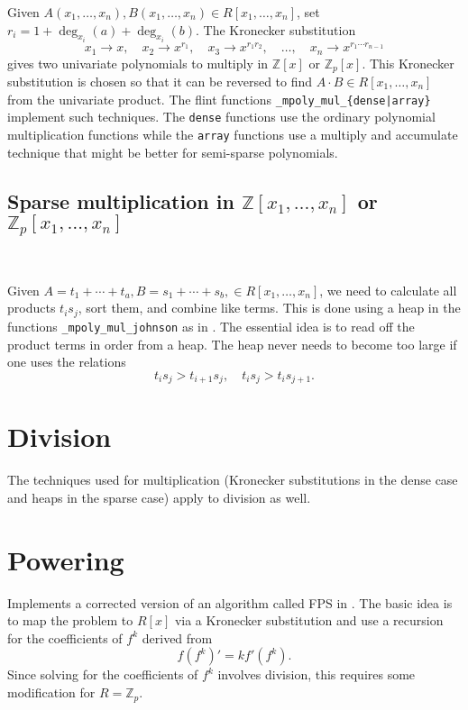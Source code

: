 \documentclass[11pt,reqno]{amsart}
\numberwithin{equation}{section}
\newcommand{\op}[1]  { \operatorname{ #1 }}
\newcommand{\bbZ}[0]  { \mathbb{Z}}
\begin{document}
Given $A(x_1,\dots,x_n), B(x_1,\dots,x_n) \in R[x_1,\dots,x_n]$, set $r_i = 1 + \op{deg}_{x_i}(a) + \op{deg}_{x_i}(b)$. The Kronecker substitution
\begin{equation*}
x_1 \to x, \quad x_2 \to x^{r_1}, \quad x_3 \to x^{r_1 r_2}, \quad \dots, \quad x_n \to x^{r_1 \cdots r_{n-1}}
\end{equation*}
gives two univariate polynomials to multiply in $\bbZ[x]$ or $\bbZ_p[x]$. This 
Kronecker substitution is chosen so that it can be reversed to find
$A \cdot B \in R[x_1,\dots,x_n]$ from the univariate product. The flint
functions {\tt \_mpoly\_mul\_\{dense|array\}} implement such techniques. The
{\tt dense} functions use the ordinary polynomial multiplication functions
while the {\tt array} functions use a multiply and accumulate technique that
might be better for semi-sparse polynomials.

\subsection{Sparse multiplication in $\bbZ[x_1,\dots,x_n]$ or $\bbZ_p[x_1,\dots,x_n]$}\

Given $A = t_1 + \cdots + t_a, B = s_1 + \cdots + s_b, \in R[x_1,\dots,x_n]$,
we need to calculate all products $t_i s_j$, sort them, and combine like terms.
This is done using a heap in the functions {\tt \_mpoly\_mul\_johnson} as in
\cite{Johnson}. The essential idea is to read off the product terms in order
from a heap. The heap never needs to become too large if one uses the relations
\begin{equation*}
t_i s_j > t_{i+1} s_j, \quad t_i s_j > t_i s_{j+1}\text{.}
\end{equation*}


\section{Division}

The techniques used for multiplication (Kronecker substitutions in the dense
case and heaps in the sparse case) apply to division as well.


\section{Powering}

Implements a corrected version of an algorithm called FPS in \cite{FPS}. The
basic idea is to map the problem to $R[x]$ via a Kronecker substitution and use
a recursion for the coefficients of $f^k$ derived from
\begin{equation*}
f (f^k)' = k f' (f^k)\text{.}
\end{equation*}
Since solving for the coefficients of $f^k$ involves division, this requires
some modification for $R=\bbZ_p$.
\end{document}
